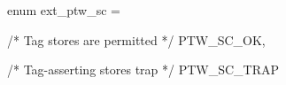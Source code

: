 enum ext_ptw_sc = {
  /* Tag stores are permitted */
  PTW_SC_OK,

  /* Tag-asserting stores trap */
  PTW_SC_TRAP
}
